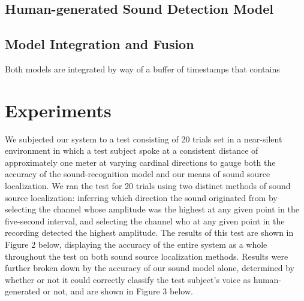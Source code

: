 \documentclass{article}
\begin{document}
\subsection{Human-generated Sound Detection Model}

\subsection{Model Integration and Fusion}
Both models are integrated by way of a buffer of timestamps that contains 


\section{Experiments}
We subjected our system to a test consisting of 20 trials set in a near-silent environment in which a test subject spoke at a consistent distance of approximately one meter at varying cardinal directions to gauge both the accuracy of the sound-recognition model and our means of sound source localization. We ran the test for 20 trials using two distinct methods of sound source localization: inferring which direction the sound originated from by selecting the channel whose amplitude was the highest at any given point in the five-second interval, and selecting the channel who at any given point in the recording detected the highest amplitude. The results of this test are shown in Figure 2 below, displaying the accuracy of the entire system as a whole throughout the test on both sound source localization methods. Results were further broken down by the accuracy of our sound model alone, determined by whether or not it could correctly classify the test subject’s voice as human-generated or not, and are shown in Figure 3 below.
\end{document}
